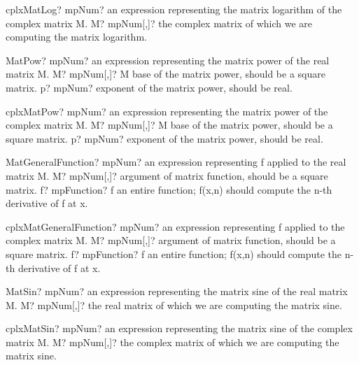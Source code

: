 \documentclass[12pt,a4paper,openany]{book}
\begin{document}
\begin{mpFunctionsExtract}
\mpFunctionOne
{cplxMatLog? mpNum? an expression representing the matrix logarithm of the complex matrix M.}
{M? mpNum[,]? the complex matrix of which we are computing the matrix logarithm.}
\end{mpFunctionsExtract}

\begin{mpFunctionsExtract}
\mpFunctionTwo
{MatPow? mpNum? an expression representing the matrix power of the real matrix M.}
{M? mpNum[,]? M base of the matrix power, should be a square matrix.}
{p? mpNum? exponent of the matrix power, should be real.}
\end{mpFunctionsExtract}

\begin{mpFunctionsExtract}
\mpFunctionTwo
{cplxMatPow? mpNum? an expression representing the matrix power of the complex matrix M.}
{M? mpNum[,]? M base of the matrix power, should be a square matrix.}
{p? mpNum? exponent of the matrix power, should be real.}
\end{mpFunctionsExtract}

\begin{mpFunctionsExtract}
\mpFunctionTwo
{MatGeneralFunction? mpNum? an expression representing f applied to the real matrix M.}
{M? mpNum[,]? argument of matrix function, should be a square matrix.}
{f? mpFunction? f an entire function; f(x,n) should compute the n-th derivative of f at x.}
\end{mpFunctionsExtract}

\begin{mpFunctionsExtract}
\mpFunctionTwo
{cplxMatGeneralFunction? mpNum? an expression representing f applied to the complex matrix M.}
{M? mpNum[,]? argument of matrix function, should be a square matrix.}
{f? mpFunction? f an entire function; f(x,n) should compute the n-th derivative of f at x.}
\end{mpFunctionsExtract}

\begin{mpFunctionsExtract}
\mpFunctionOne
{MatSin? mpNum? an expression representing the matrix sine of the real matrix M.}
{M? mpNum[,]? the real matrix of which we are computing the matrix sine.}
\end{mpFunctionsExtract}

\begin{mpFunctionsExtract}
\mpFunctionOne
{cplxMatSin? mpNum? an expression representing the matrix sine of the complex matrix M.}
{M? mpNum[,]? the complex matrix of which we are computing the matrix sine.}
\end{mpFunctionsExtract}
\end{document}
